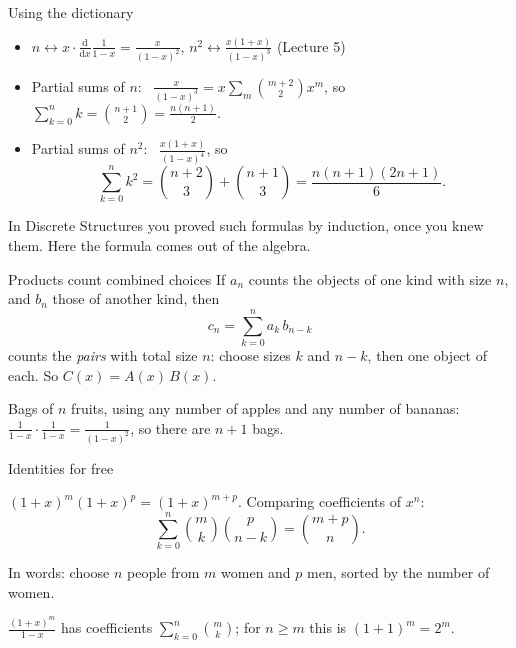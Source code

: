 \documentclass[10pt]{wosm-slides}
\begin{document}
\begin{frame}{Using the dictionary}
  \begin{itemize}
    \item $n \leftrightarrow x \cdot \frac{\mathrm{d}}{\mathrm{d}x} \frac{1}{1-x} = \frac{x}{(1-x)^2}$,
      \quad $n^2 \leftrightarrow \frac{x(1+x)}{(1-x)^3}$ \quad (Lecture 5)
  \end{itemize}
  \pause
  \begin{example}
    \begin{itemize}
      \item Partial sums of $n$: \
        $\frac{x}{(1-x)^3} = x \sum_m \binom{m+2}{2} x^m$, so
        $\sum_{k=0}^n k = \binom{n+1}{2} = \frac{n(n+1)}{2}$.
      \item Partial sums of $n^2$: \ $\frac{x(1+x)}{(1-x)^4}$, so
        \[ \sum_{k=0}^n k^2 = \binom{n+2}{3} + \binom{n+1}{3} = \frac{n(n+1)(2n+1)}{6} . \]
    \end{itemize}
  \end{example}
  {\small In Discrete Structures you proved such formulas by induction, once you knew them.
  Here the formula comes out of the algebra.\par}
\end{frame}

\begin{frame}{Products count combined choices}
  If $a_n$ counts the objects of one kind with size $n$, and $b_n$ those of another kind, then
  \[ c_n = \sum_{k=0}^{n} a_k\, b_{n-k} \]
  counts the \emph{pairs} with total size $n$: choose sizes $k$ and $n - k$, then one object of each.
  So $C(x) = A(x)\, B(x)$.
  \pause
  \begin{example}
    Bags of $n$ fruits, using any number of apples and any number of bananas:
    $\frac{1}{1-x} \cdot \frac{1}{1-x} = \frac{1}{(1-x)^2}$, so there are $n + 1$ bags.
  \end{example}
\end{frame}

\begin{frame}{Identities for free}
  \begin{example}
    $(1+x)^m (1+x)^p = (1+x)^{m+p}$. Comparing coefficients of $x^n$:
    \[ \sum_{k=0}^{n} \binom{m}{k}\binom{p}{n-k} = \binom{m+p}{n} . \]
  \end{example}
  {\small In words: choose $n$ people from $m$ women and $p$ men, sorted by the number of women.\par}
  \pause
  \begin{example}
    $\frac{(1+x)^m}{1-x}$ has coefficients $\sum_{k=0}^n \binom{m}{k}$; for $n \ge m$ this is
    $(1 + 1)^m = 2^m$.
  \end{example}
\end{frame}
\end{document}
